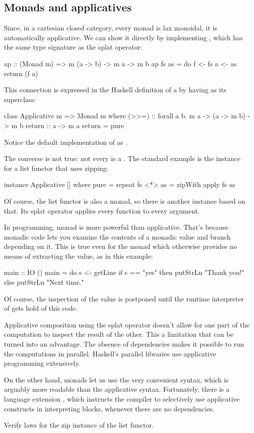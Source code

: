 \documentclass[DaoFP]{subfiles}
\begin{document}
\subsection{Monads and applicatives}

Since, in a cartesian closed category, every monad is lax monoidal, it is automatically applicative. We can show it directly by implementing , which has the same type signature as the splat operator:
\begin{haskell}
ap :: (Monad m) => m (a -> b) -> m a -> m b
ap fs as = do 
    f <- fs
    a <- as
    return (f a) 
\end{haskell}

This connection is expressed in the Haskell definition of a  by having  as its superclass:
\begin{haskell}
class Applicative m => Monad m where
    (>>=)       :: forall a b. m a -> (a -> m b) -> m b
    return      :: a -> m a
    return      = pure
\end{haskell}
Notice the default implementation of  as . 

The converse is not true: not every  is a . The standard example is the  instance for a list functor that uses zipping:
\begin{haskell}
instance Applicative [] where
  pure = repeat
  fs <*> as = zipWith apply fs as
\end{haskell}
Of course, the list functor is also a monad, so there is another  instance based on that. Its splat operator applies every function to every argument.

In programming, monad is more powerful than applicative. That's because monadic code lets you examine the contents of a monadic value and branch depending on it. This is true even for the  monad which otherwise provides no means of extracting the value, as in this example:
\begin{haskell}
main :: IO ()
main = do
  s <- getLine
  if s == "yes"
  then putStrLn "Thank you!"
  else putStrLn "Next time."
\end{haskell}
Of course, the inspection of the value is postponed until the runtime interpreter of  gets hold of this code. 

Applicative composition using the splat operator doesn't allow for one part of the computation to inspect the result of the other. This a limitation that can be turned into an advantage. The absence of dependencies makes it possible to run the computations in parallel.  Haskell's parallel libraries use applicative programming extensively.

On the other hand, monads let us use the very convenient  syntax, which is arguably more readable than the applicative syntax. Fortunately, there is a language extension , which instructs the compiler to selectively use applicative constructs in interpreting  blocks, whenever there are no dependencies.

\begin{exercise}
Verify  laws for the zip instance of the list functor.
\end{exercise}
\end{document}

